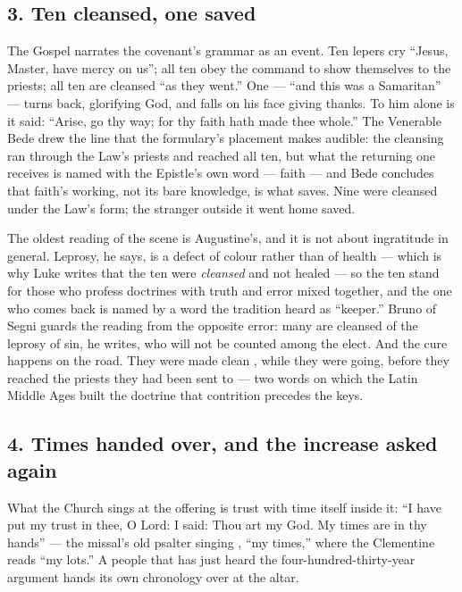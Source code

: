 \subsection*{3. Ten cleansed, one saved}

The Gospel narrates the covenant's grammar as an event. Ten lepers cry
``Jesus, Master, have mercy on us''; all ten obey the command to show
themselves to the priests; all ten are cleansed ``as they went.'' One ---
``and this was a Samaritan'' --- turns back, glorifying God, and falls on his
face giving thanks. To him alone is it said: ``Arise, go thy way; for thy
faith hath made thee whole.'' The Venerable Bede drew the line that the
formulary's placement makes audible: the cleansing ran through the Law's
priests and reached all ten, but what the returning one receives is named
with the Epistle's own word --- faith --- and Bede concludes that faith's
working, not its bare knowledge, is what saves. Nine were cleansed under the
Law's form; the stranger outside it went home saved.

The oldest reading of the scene is Augustine's, and it is not about ingratitude
in general. Leprosy, he says, is a defect of colour rather than of health ---
which is why Luke writes that the ten were \emph{cleansed} and not healed --- so
the ten stand for those who profess doctrines with truth and error mixed
together, and the one who comes back is named by a word the tradition heard as
``keeper.'' Bruno of Segni guards the reading from the opposite error: many are
cleansed of the leprosy of sin, he writes, who will not be counted among the
elect. And the cure happens on the road. They were made clean
, while they were going, before they reached the priests they
had been sent to --- two words on which the Latin Middle Ages built the
doctrine that contrition precedes the keys.

\subsection*{4. Times handed over, and the increase asked again}

What the Church sings at the offering is trust with time itself inside it:
``I have put my trust in thee, O Lord: I said: Thou art my God. My times are
in thy hands'' --- the missal's old psalter singing ,
``my times,'' where the Clementine reads ``my lots.'' A people that has just
heard the four-hundred-thirty-year argument hands its own chronology over at
the altar.

